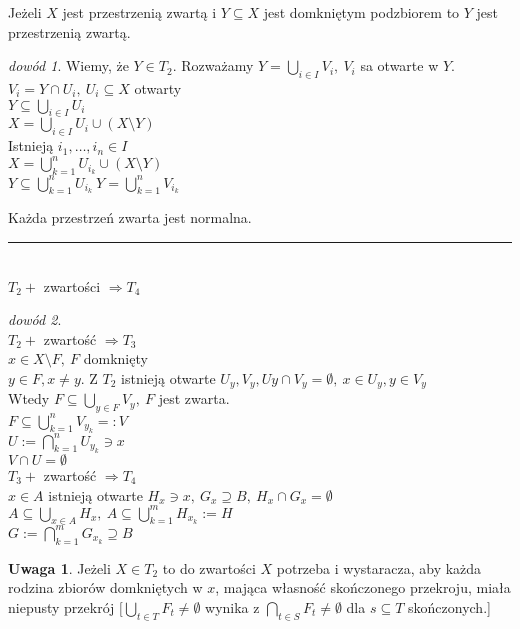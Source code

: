 \documentclass[twoside,10pt]{article}
\theoremstyle{definition}
\theoremstyle{definition}
\theoremstyle{definition}
\theoremstyle{definition}
\theoremstyle{remark}
\newtheorem*{dd}{dowód}
\theoremstyle{definition}
\newtheorem*{uw}{Uwaga}
\theoremstyle{definition}
\theoremstyle{definition}
\theoremstyle{definition}
\theoremstyle{definition}
\theoremstyle{definition}
\begin{document}
\begin{lem} 
    Jeżeli $X$ jest przestrzenią zwartą i $Y \subseteq X$ jest domkniętym podzbiorem to 
    $Y$ jest przestrzenią zwartą. 
    \begin{dd} 
        Wiemy, że $Y \in T_2$. Rozważamy $Y = \bigcup\limits_{i \in I} V_i,\ V_i$ sa
        otwarte w $Y$. \\ 
        $V_i = Y \cap U_i,\ U_i \subseteq X$ otwarty \\ 
        $Y \subseteq \bigcup\limits_{i \in I} U_i$ \\ 
        $X = \bigcup\limits_{i \in I} U_i \cup (X \setminus Y)$ \\ 
        Istnieją $i_1,\ldots,i_n \in I$ \\ 
        $X = \bigcup\limits_{k = 1}^n U_{i_k} \cup (X \setminus Y)$ \\ 
        $Y \subseteq \bigcup\limits_{k=1}^n U_{i_k} \ Y = \bigcup\limits_{k=1}^n V_{i_k}$
    \end{dd} 
\end{lem} 
\begin{tw} 
    Każda przestrzeń zwarta jest normalna. \\ 
    \rule{2cm}{0.4pt} \\
    \footnotesize{$T_2 + $ zwartości $\Rightarrow T_4$}
\end{tw} 
\begin{dd} ~\\ 
    $T_2 +$ zwartość $\Rightarrow T_3$ \\ 
    $x \in X \setminus F,\ F$ domknięty \\
    $y \in F, x \neq y$. Z $T_2$ istnieją otwarte $U_y, V_y, Uy
    \cap V_y = \emptyset,\ x \in U_y, y \in V_y$ \\ 
    Wtedy $F \subseteq \bigcup\limits_{y \in F} V_y,\ F$ jest zwarta. \\ 
    $F \subseteq \bigcup\limits_{k=1}^n V_{y_k} =: V$ \\ 
    $U := \bigcap\limits_{k=1}^n U_{y_k} \ni x$ \\
    $V \cap U = \emptyset$ \\ 
    $T_3 +$ zwartość $\Rightarrow T_4$ \\ 
    $x \in A$ istnieją otwarte $H_x \ni x,\ G_x \supseteq B,\ H_x \cap G_x = \emptyset$ \\
    $A \subseteq \bigcup\limits_{x \in A} H_x, \ A \subseteq \bigcup\limits_{k=1}^m
    H_{x_k} := H$ \\ 
    $G := \bigcap\limits_{k=1}^m G_{x_k} \supseteq B$
\end{dd} 
\begin{uw} 
    Jeżeli $X \in T_2$ to do zwartości $X$ potrzeba i wystaracza, aby każda rodzina
    zbiorów domkniętych w $x$, mająca własność skończonego przekroju, miała niepusty 
    przekrój $[ \bigcup\limits_{t \in T} F_t \neq \emptyset$ wynika z $\bigcap\limits_{t
    \in S} F_t \neq \emptyset$ dla $ s \subseteq T$ skończonych.]
\end{uw} 
\end{document}
